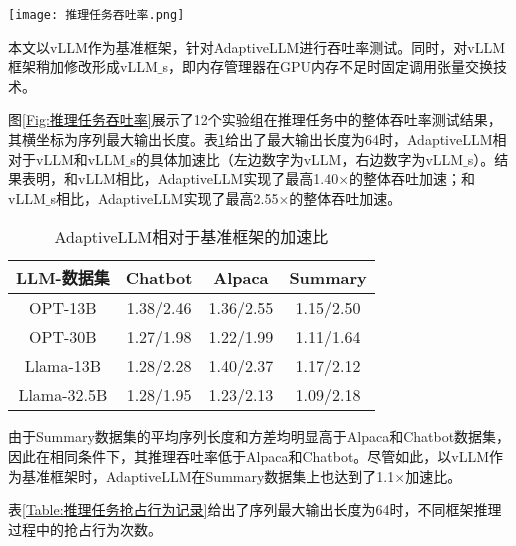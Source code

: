 \begin{figure*}[!htbp]
  \centering
  \texttt{[image: 推理任务吞吐率.png]}
  \caption{推理任务吞吐率}
  \label{Fig:推理任务吞吐率}
\end{figure*}

本文以vLLM作为基准框架，针对AdaptiveLLM进行吞吐率测试。同时，对vLLM框架稍加修改形成vLLM$\_$s，即内存管理器在GPU内存不足时固定调用张量交换技术。 \par

图\ref{Fig:推理任务吞吐率}展示了12个实验组在推理任务中的整体吞吐率测试结果，其横坐标为序列最大输出长度。表\ref{Table:AdaptiveLLM相对于基准框架的加速比}给出了最大输出长度为64时，AdaptiveLLM相对于vLLM和vLLM$\_$s的具体加速比（左边数字为vLLM，右边数字为vLLM$\_$s）。结果表明，和vLLM相比，AdaptiveLLM实现了最高1.40$\times$的整体吞吐加速；和vLLM$\_$s相比，AdaptiveLLM实现了最高2.55$\times$的整体吞吐加速。

\begin{table}[H]
  \centering
  \caption{AdaptiveLLM相对于基准框架的加速比}
  \label{Table:AdaptiveLLM相对于基准框架的加速比}
  \renewcommand{\arraystretch}{1.3}
  \small
  \begin{tabular}{c c c c}
    \toprule
    \textbf{LLM-数据集} & \textbf{Chatbot} & \textbf{Alpaca} & \textbf{Summary} \\
    \midrule
    OPT-13B	& 1.38/2.46 & 1.36/2.55 & 1.15/2.50 \\
    OPT-30B	& 1.27/1.98 & 1.22/1.99 & 1.11/1.64 \\
    Llama-13B & 1.28/2.28 & 1.40/2.37 & 1.17/2.12 \\
    Llama-32.5B & 1.28/1.95 & 1.23/2.13 & 1.09/2.18 \\
    \bottomrule
  \end{tabular}
\end{table}

由于Summary数据集的平均序列长度和方差均明显高于Alpaca和Chatbot数据集，因此在相同条件下，其推理吞吐率低于Alpaca和Chatbot。尽管如此，以vLLM作为基准框架时，AdaptiveLLM在Summary数据集上也达到了1.1$\times$加速比。

表\ref{Table:推理任务抢占行为记录}给出了序列最大输出长度为64时，不同框架推理过程中的抢占行为次数。

